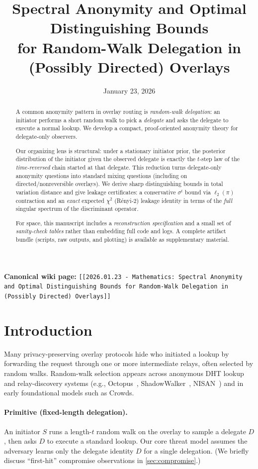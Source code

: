\documentclass[11pt]{article}
\title{Spectral Anonymity and Optimal Distinguishing Bounds\\for Random-Walk Delegation in (Possibly Directed) Overlays}
\author{}
\date{January 23, 2026}
\begin{document}
\maketitle

\noindent\textbf{Canonical wiki page:} \texttt{[[2026.01.23 - Mathematics: Spectral Anonymity and Optimal Distinguishing Bounds for Random-Walk Delegation in (Possibly Directed) Overlays]]}\\


\begin{abstract}
A common anonymity pattern in overlay routing is \emph{random-walk delegation}:
an initiator performs a short random walk to pick a \emph{delegate} and asks the
delegate to execute a normal lookup. We develop a compact, proof-oriented
anonymity theory for delegate-only observers.

Our organizing lens is structural: under a stationary initiator prior, the
posterior distribution of the initiator given the observed delegate is exactly
the $t$-step law of the \emph{time-reversed} chain started at that delegate.
This reduction turns delegate-only anonymity questions into standard mixing
questions (including on directed/nonreversible overlays). We derive sharp
distinguishing bounds in total variation distance and give leakage certificates:
a conservative $\sigma^t$ bound via $\ell_2(\pi)$ contraction and an \emph{exact}
expected $\chi^2$ (R\'enyi-2) leakage identity in terms of the \emph{full}
singular spectrum of the discriminant operator.

For space, this manuscript includes a \emph{reconstruction specification} and a
small set of \emph{sanity-check tables} rather than embedding full code and logs.
A complete artifact bundle (scripts, raw outputs, and plotting) is available as
supplementary material.
\end{abstract}

\section{Introduction}\label{sec:intro}
Many privacy-preserving overlay protocols hide who initiated a lookup by
forwarding the request through one or more intermediate relays, often selected
by random walks. Random-walk selection appears across anonymous DHT lookup and
relay-discovery systems (e.g., Octopus~\cite{octopus}, ShadowWalker~\cite{shadowwalker}, NISAN~\cite{nisan}) and in early
foundational models such as Crowds.

\paragraph{Primitive (fixed-length delegation).}
An initiator $S$ runs a length-$t$ random walk on the overlay to sample a
delegate $D$, then asks $D$ to execute a standard lookup. Our core threat model
assumes the adversary learns only the delegate identity $D$ for a single
delegation. (We briefly discuss ``first-hit'' compromise observations in
\cref{sec:compromise}.)
\end{document}
